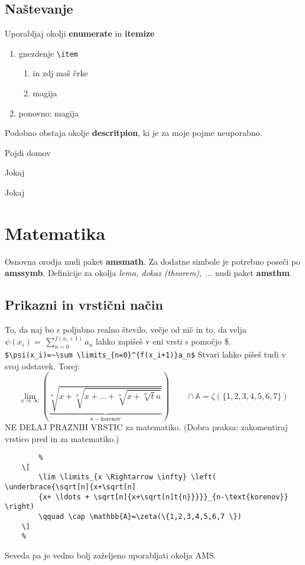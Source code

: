\documentclass[a4paper, 12pt]{article}
\newcommand{\tx}{\hspace*{0pt}\hfill\verb}
\begin{document}
    \subsection{Naštevanje}
    Uporabljaj okolji \textbf{enumerate} in \textbf{itemize}
    \begin{enumerate}
        \item gnezdenje \tx|\item|
        \begin{enumerate}
            \item in zdj maš črke
            \item magija
        \end{enumerate}
        \item ponovno: magija
    \end{enumerate}
    Podobno obstaja okolje \textbf{descritpion}, ki je za moje pojme neuporabno.
    \begin{description}
        \item Pojdi domov 
        \item Jokaj
        \item Jokaj
    \end{description}


    \section{Matematika}
    Osnovna orodja nudi paket \textbf{amsmath}. Za dodatne simbole je potrebno poseči po \textbf{amssymb}. Definicije za okolja \emph{lema, dokaz (theorem), ...} nudi paket \textbf{amsthm}.
    \subsection{Prikazni in vrstični način}
    To, da naj bo $\epsilon$ poljubno realno število, večje od nič in to, da velja $\psi(x_i)=~\sum \limits_{n=0}^{f(x_i+1)}a_n$ lahko zapišeš v eni vrsti s pomočjo \$.
    \\ \tx|$\psi(x_i)=~\sum \limits_{n=0}^{f(x_i+1)}a_n$|
    Stvari lahko pišeš tudi v svoj odstavek. Torej:
    \[
        \lim \limits_{x \Rightarrow \infty} \left( \underbrace{\sqrt[n]{x+\sqrt[n]{x+ \ldots + \sqrt[n]{x+\sqrt[n]t{n}}}}}_{n-\text{korenov}} \right) \qquad \cap \mathbb{A}=\zeta(\{1,2,3,4,5,6,7 \})
    \]
    NE DELAJ PRAZNIH VRSTIC za matematiko. (Dobra praksa: zakomentiraj vrstico pred in za matematiko.)
    {\small
    \begin{verbatim}
        %
    \[
        \lim \limits_{x \Rightarrow \infty} \left( \underbrace{\sqrt[n]{x+\sqrt[n]
        {x+ \ldots + \sqrt[n]{x+\sqrt[n]t{n}}}}}_{n-\text{korenov}} \right) 
        \qquad \cap \mathbb{A}=\zeta(\{1,2,3,4,5,6,7 \})
    \]
    %
    \end{verbatim}}
    Seveda pa je vedno bolj zaželjeno uporabljati okolja AMS.
\end{document}
